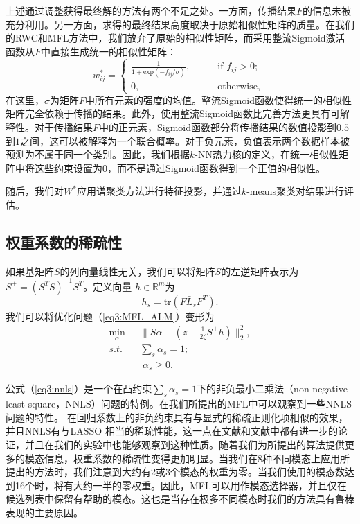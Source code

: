 上述通过调整获得最终解的方法有两个不足之处。一方面，传播结果$ {F} $的信息未被充分利用。另一方面，求得的最终结果高度取决于原始相似性矩阵的质量。在我们的RWC和MFL方法中，我们放弃了原始的相似性矩阵，而采用整流Sigmoid激活函数从$F$中直接生成统一的相似性矩阵：
\begin{equation}
w^*_{ij} = 
\begin{cases}
\frac{1}{1+\text{exp}(-f_{ij}/\sigma)}, \qquad &\text{if }f_{ij}>0;\\
0, &\text{otherwise, }
\end{cases}
\label{eq3:rSa}
\end{equation}
在这里，$ \sigma  $为矩阵$F$中所有元素的强度的均值。整流Sigmoid函数使得统一的相似性矩阵完全依赖于传播的结果。此外，使用整流Sigmoid函数比完善方法更具有可解释性。对于传播结果$F$中的正元素，Sigmoid函数部分将传播结果的数值投影到$0.5$到$1$之间，这可以被解释为一个联合概率。对于负元素，负值表示两个数据样本被预测为不属于同一个类别。因此，我们根据$k$-NN热力核的定义，在统一相似性矩阵中将这些约束设置为$0$，而不是通过Sigmoid函数得到一个正值的相似性。

随后，我们对$ W^* $应用谱聚类方法\cite{von2007tutorial}进行特征投影，并通过$ k$-means聚类对结果进行评估。

\subsection{权重系数的稀疏性}
\label{sec3:dis}
如果基矩阵$S$的列向量线性无关，我们可以将矩阵$S$的左逆矩阵表示为$ {S} ^+ = ({S}^T{S})^{-1}{S}^T$。定义向量 $ {h} \in  \mathbb{R}^{m} $为
\begin{equation}
h_s = \text{tr}({F} \bar{{L}}_s{F}^T).
\end{equation}
我们可以将优化问题（\ref{eq3:MFL_ALM}）变形为
\begin{equation}
\begin{split}
\mathop{\mathrm{min}}_{{\alpha}}\;&\|{S}{\alpha} - ( {z} - \frac{1}{2\zeta}{S}^+ {h}) \|_2^2,\\
s.t.\quad& \sum_s \alpha_s = 1;\\ &\; \alpha_s \ge 0.
\label{eq3:nnls}
\end{split}
\end{equation}

公式（\ref{eq3:nnls}）是一个在凸约束$ \sum_s \alpha_s = 1 $下的非负最小二乘法（non-negative least square，NNLS）问题的特例。在我们所提出的MFL中可以观察到一些NNLS问题的特性。
在回归系数上的非负约束具有与显式的稀疏正则化项相似的效果，并且NNLS有与LASSO \cite{tibshirani1996regression}相当的稀疏性能，这一点在文献\parencite{slawski2011sparse}和文献\parencite{slawski2013non}中都有进一步的论证，并且在我们的实验中也能够观察到这种性质。随着我们为所提出的算法提供更多的模态信息，权重系数的稀疏性变得更加明显。当我们在8种不同模态上应用所提出的方法时，我们注意到大约有2或3个模态的权重为零。当我们使用的模态数达到16个时，将有大约一半的零权重。因此，MFL可以用作模态选择器，并且仅在候选列表中保留有帮助的模态。这也是当存在极多不同模态时我们的方法具有鲁棒表现的主要原因。

